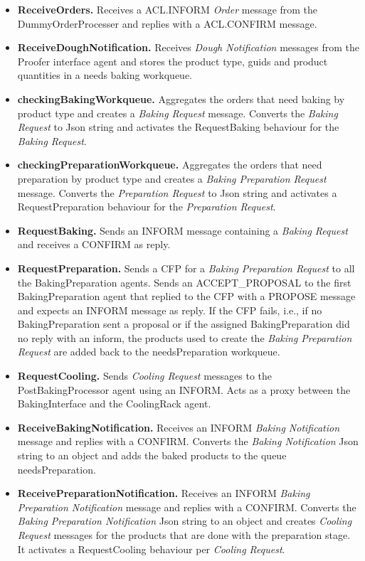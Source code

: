 \documentclass[paper=a4, fontsize=11pt]{scrartcl}
\begin{document}
	\begin{itemize}
		\item  \textbf{ReceiveOrders.} Receives a ACL.INFORM \textit{Order} message from the DummyOrderProcesser and replies with a ACL.CONFIRM message. 
		
		\item  \textbf{ReceiveDoughNotification.} Receives \textit{Dough Notification} messages from the Proofer interface agent and stores the product type, guids and product quantities in a needs baking workqueue. 
		
		\item \textbf{checkingBakingWorkqueue.} Aggregates the orders that need baking by product type and creates a \textit{Baking Request} message. Converts the \textit{Baking Request} to Json string and activates the RequestBaking behaviour for the \textit{Baking Request}.
		
		\item \textbf{checkingPreparationWorkqueue.} Aggregates the orders that need preparation by product type and creates a \textit{Baking Preparation Request} message. Converts the \textit{Preparation Request} to Json string and activates a RequestPreparation behaviour for the \textit{Preparation Request}.
		
		\item \textbf{RequestBaking.} Sends an INFORM message containing a \textit{Baking Request} and receives a CONFIRM as reply.
		
		\item \textbf{RequestPreparation.} Sends a CFP for a \textit{Baking Preparation Request} to all the BakingPreparation agents. Sends an ACCEPT\_PROPOSAL to the first BakingPreparation agent that replied to the CFP with a PROPOSE message and expects an INFORM message as reply. If the CFP fails, i.e., if no BakingPreparation sent a proposal or if the assigned BakingPreparation did no reply with an inform, the products used to create the \textit{Baking Preparation Request} are added back to the needsPreparation workqueue.
		
		\item \textbf{RequestCooling.} Sends \textit{Cooling Request} messages to the PostBakingProcessor agent using an INFORM. Acts as a proxy between the BakingInterface and the CoolingRack agent. 
		
		\item \textbf{ReceiveBakingNotification.} Receives an INFORM \textit{Baking Notification} message and replies with a CONFIRM. Converts the \textit{Baking Notification} Json string to an object and adds the baked products to the queue needsPreparation. 
		
		\item \textbf{ReceivePreparationNotification.} Receives an INFORM \textit{Baking Preparation Notification} message and replies with a CONFIRM. Converts the \textit{Baking Preparation Notification} Json string to an object and creates \textit{Cooling Request} messages for the products that are done with the preparation stage. It activates a RequestCooling behaviour per \textit{Cooling Request}.
			
	\end{itemize}
	
\end{document}
